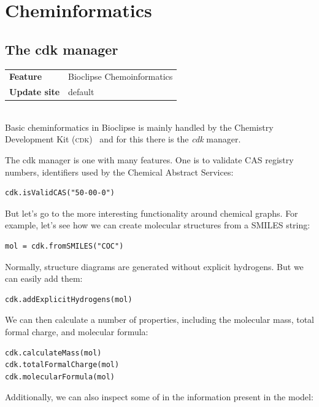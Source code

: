 \documentclass[a5paper, 10pt]{memoir}
\begin{document}
\chapter{Cheminformatics}
\begin{refsection}


\section{The cdk manager}

\begin{tabular}{ll}
\textbf{Feature} & Bioclipse Chemoinformatics \\
\textbf{Update site} & default \\
\end{tabular} \\

\noindent
Basic cheminformatics in Bioclipse is mainly handled by the Chemistry
Development Kit
(\textsc{cdk})~\cite{Steinbeck2003,Steinbeck2006} and for this there is the
\emph{cdk} manager.

The cdk manager is one with many features. One is to validate
\textsc{CAS} registry numbers, identifiers used by the Chemical Abstract
Services:

\begin{Verbatim}
cdk.isValidCAS("50-00-0")
\end{Verbatim}

But let's go to the more interesting functionality around chemical graphs. For
example, let's see how we can create molecular structures from a SMILES
string:

\begin{Verbatim}
mol = cdk.fromSMILES("COC")
\end{Verbatim}
Normally, structure diagrams are generated without explicit hydrogens. But we
can easily add them:

\begin{Verbatim}
cdk.addExplicitHydrogens(mol)
\end{Verbatim}
We can then calculate a number of properties, including the molecular
mass, total formal charge, and molecular
formula:

\begin{Verbatim}
cdk.calculateMass(mol)
cdk.totalFormalCharge(mol)
cdk.molecularFormula(mol)
\end{Verbatim}
Additionally, we can also inspect some of in the information present in the
model:


\end{refsection}
\end{document}
